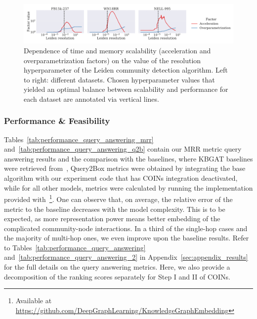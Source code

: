 \begin{figure}[H]
\begin{center}
\includegraphics[width=\textwidth]{figures/coins/scalability_leiden_resolution}
\end{center}
\caption[Dependence of time and memory scalability on the value of the resolution hyperparameter of the Leiden community detection algorithm.]{Dependence of time and memory scalability (acceleration and overparametrization factors) on the value of the resolution hyperparameter of the Leiden community detection algorithm. Left to right: different datasets. Chosen hyperparameter values that yielded an optimal balance between scalability and performance for each dataset are annotated via vertical lines.}
\label{fig:scalability_resolution}
\end{figure}

\subsubsection{Performance \& Feasibility}

Tables~\ref{tab:performance_query_answering_mrr} and~\ref{tab:performance_query_answering_q2b} contain our MRR metric query answering results and the comparison with the baselines, where KBGAT baselines were retrieved from~\cite{nathani_learning_2019}, Query2Box metrics were obtained by integrating the base algorithm with our experiment code that has COINs integration deactivated, while for all other models, metrics were calculated by running the implementation provided with~\cite{sun_rotate_2019}\footnote{Available at \url{https://github.com/DeepGraphLearning/KnowledgeGraphEmbedding}}. 
One can observe that, on average, the relative error of the metric to the baseline decreases with the model complexity. This is to be expected, as more representation power means better embedding of the complicated community-node interactions. In a third of the single-hop cases and the majority of multi-hop ones, we even improve upon the baseline results. Refer to Tables~\ref{tab:performance_query_answering} and~\ref{tab:performance_query_answering_2} in Appendix~\ref{sec:appendix_results} for the full details on the query answering metrics. Here, we also provide a decomposition of the ranking scores separately for Step I and II of COINs.

